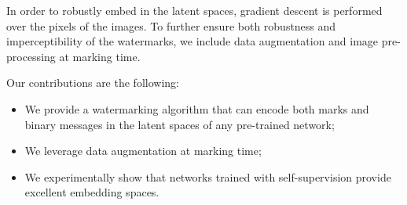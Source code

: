 In order to robustly embed in the latent spaces, gradient descent is performed over the pixels of the images. 
To further ensure both robustness and imperceptibility of the watermarks, we include data augmentation and image pre-processing at marking time.

Our contributions are the following:
\begin{itemize}
    \setlength\itemsep{0.1em}
    \item We provide a watermarking algorithm that can encode both marks and binary messages in the latent spaces of any pre-trained network;
    \item We leverage data augmentation at marking time;
    \item We experimentally show that networks trained with self-supervision provide excellent embedding spaces.
\end{itemize}
